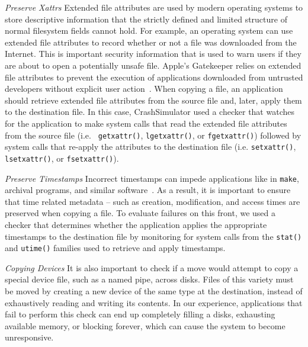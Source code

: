 {\it Preserve Xattrs} Extended file attributes
are used by modern operating systems
to store descriptive information
that the strictly defined and limited structure
of normal filesystem fields cannot hold.
For example,
an operating system can use extended file attributes
to record whether or not a file was downloaded from the Internet.
This is important security information
that is used to warn users
if they are about to open a potentially unsafe file.
Apple's Gatekeeper relies on extended file attributes
to prevent the execution of applications downloaded from
untrusted developers without explicit user action~\cite{AppleCodeSigning}.
When copying a file,
an application should retrieve extended file attributes from the source
file and, later, apply them to the destination file.
In this case, CrashSimulator used a checker
that watches for the application to make system calls
that read the extended file attributes from the source file (i.e. {\tt
  getxattr()}, {\tt lgetxattr()}, or {\tt fgetxattr()}) followed by system calls
that re-apply the attributes to the destination file (i.e. {\tt setxattr()},
{\tt lsetxattr()}, or {\tt fsetxattr()}).

{\it Preserve Timestamps} Incorrect timestamps can impede applications like
in {\tt make}, archival programs, and similar
software~\cite{NautilusTimestamps, SudoTimestamp}.
As a result, it is important to ensure
that time related metadata --
such as creation, modification, and access times
are preserved when copying a file.
To evaluate failures on this front,
we used a checker that determines
whether the application applies
the appropriate timestamps to the destination file
by monitoring for system calls from the {\tt stat()}
and {\tt utime()} families used to retrieve and apply timestamps.

{\it Copying Devices} It is also important to check if a move
would attempt to copy a special
device file, such as a named pipe, across disks.
Files of this variety must be moved
by creating a new device of the same type at the destination,
instead of exhaustively reading and writing its contents.
In our experience, applications that fail to perform this check
can end up completely filling a disks, exhausting available memory,
or blocking forever, which can cause the system to become unresponsive.


